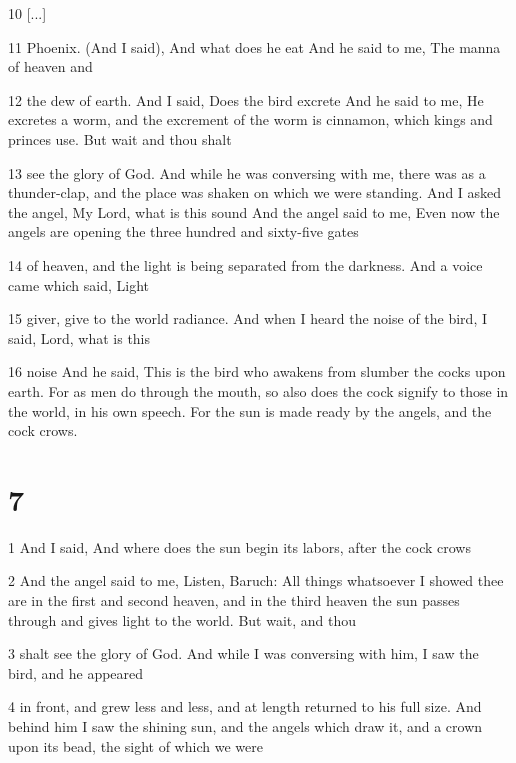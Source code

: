 \par 10 [...]

\par 11 Phoenix. (And I said), And what does he eat And he said to me, The manna of heaven and

\par 12 the dew of earth. And I said, Does the bird excrete And he said to me, He excretes a worm, and the excrement of the worm is cinnamon, which kings and princes use. But wait and thou shalt

\par 13 see the glory of God. And while he was conversing with me, there was as a thunder-clap, and the place was shaken on which we were standing. And I asked the angel, My Lord, what is this sound And the angel said to me, Even now the angels are opening the three hundred and sixty-five gates

\par 14 of heaven, and the light is being separated from the darkness. And a voice came which said, Light

\par 15 giver, give to the world radiance. And when I heard the noise of the bird, I said, Lord, what is this

\par 16 noise And he said, This is the bird who awakens from slumber the cocks upon earth. For as men do through the mouth, so also does the cock signify to those in the world, in his own speech. For the sun is made ready by the angels, and the cock crows.

\chapter{7}

\par 1 And I said, And where does the sun begin its labors, after the cock crows

\par 2 And the angel said to me, Listen, Baruch: All things whatsoever I showed thee are in the first and second heaven, and in the third heaven the sun passes through and gives light to the world. But wait, and thou

\par 3 shalt see the glory of God. And while I was conversing with him, I saw the bird, and he appeared

\par 4 in front, and grew less and less, and at length returned to his full size. And behind him I saw the shining sun, and the angels which draw it, and a crown upon its bead, the sight of which we were

